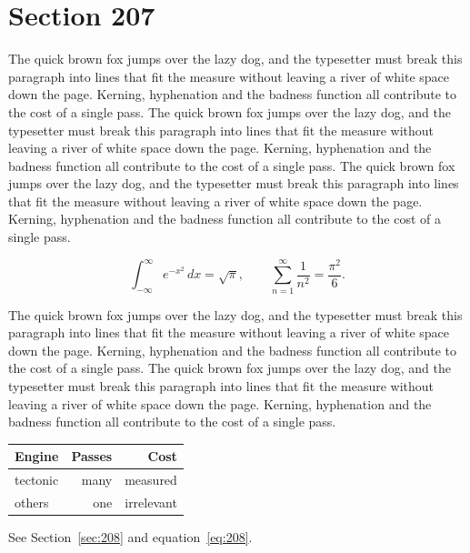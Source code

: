 \documentclass{article}
\begin{document}
\section{Section 207}
\label{sec:207}
The quick brown fox jumps over the lazy dog, and the typesetter must break this paragraph into lines that fit the measure without leaving a river of white space down the page. Kerning, hyphenation and the badness function all contribute to the cost of a single pass. The quick brown fox jumps over the lazy dog, and the typesetter must break this paragraph into lines that fit the measure without leaving a river of white space down the page. Kerning, hyphenation and the badness function all contribute to the cost of a single pass. The quick brown fox jumps over the lazy dog, and the typesetter must break this paragraph into lines that fit the measure without leaving a river of white space down the page. Kerning, hyphenation and the badness function all contribute to the cost of a single pass. 

\begin{equation}\label{eq:207}
\int_{-\infty}^{\infty} e^{-x^{2}}\,dx = \sqrt{\pi}, \qquad
\sum_{n=1}^{\infty} \frac{1}{n^{2}} = \frac{\pi^{2}}{6}.
\end{equation}

The quick brown fox jumps over the lazy dog, and the typesetter must break this paragraph into lines that fit the measure without leaving a river of white space down the page. Kerning, hyphenation and the badness function all contribute to the cost of a single pass. The quick brown fox jumps over the lazy dog, and the typesetter must break this paragraph into lines that fit the measure without leaving a river of white space down the page. Kerning, hyphenation and the badness function all contribute to the cost of a single pass. 

\begin{center}
\begin{tabular}{lrr}
\toprule
Engine & Passes & Cost \\
\midrule
tectonic & many & measured \\
others & one & irrelevant \\
\bottomrule
\end{tabular}
\end{center}

See Section~\ref{sec:208} and equation~\eqref{eq:208}.
\end{document}
